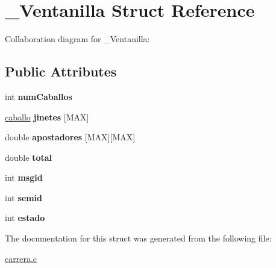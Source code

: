 \hypertarget{struct__Ventanilla}{}\section{\+\_\+\+Ventanilla Struct Reference}
\label{struct__Ventanilla}


Collaboration diagram for \+\_\+\+Ventanilla\+:
\subsection*{Public Attributes}
\begin{DoxyCompactItemize}
\item 
int {\bfseries num\+Caballos}\hypertarget{struct__Ventanilla_a9d1361c0811ea37ac86765ed0ad50a8f}{}\label{struct__Ventanilla_a9d1361c0811ea37ac86765ed0ad50a8f}

\item 
\hyperlink{struct__Caballo}{caballo} {\bfseries jinetes} \mbox{[}M\+AX\mbox{]}\hypertarget{struct__Ventanilla_ab359f2cc43a4adf0b65ccf8ffd5cd145}{}\label{struct__Ventanilla_ab359f2cc43a4adf0b65ccf8ffd5cd145}

\item 
double {\bfseries apostadores} \mbox{[}M\+AX\mbox{]}\mbox{[}M\+AX\mbox{]}\hypertarget{struct__Ventanilla_a19ef890de873fe54c27d1726fb9ca947}{}\label{struct__Ventanilla_a19ef890de873fe54c27d1726fb9ca947}

\item 
double {\bfseries total}\hypertarget{struct__Ventanilla_a1b4846eb8da9d38419a3f918fe9665c1}{}\label{struct__Ventanilla_a1b4846eb8da9d38419a3f918fe9665c1}

\item 
int {\bfseries msgid}\hypertarget{struct__Ventanilla_a66a8337f17a857c1ad379db598bba1c9}{}\label{struct__Ventanilla_a66a8337f17a857c1ad379db598bba1c9}

\item 
int {\bfseries semid}\hypertarget{struct__Ventanilla_a2834f69015926e1879286fe9af2a72b3}{}\label{struct__Ventanilla_a2834f69015926e1879286fe9af2a72b3}

\item 
int {\bfseries estado}\hypertarget{struct__Ventanilla_a6b5316b20a1be71403695aeac94346e5}{}\label{struct__Ventanilla_a6b5316b20a1be71403695aeac94346e5}

\end{DoxyCompactItemize}


The documentation for this struct was generated from the following file\+:\begin{DoxyCompactItemize}
\item 
\hyperlink{carrera_8c}{carrera.\+c}\end{DoxyCompactItemize}
